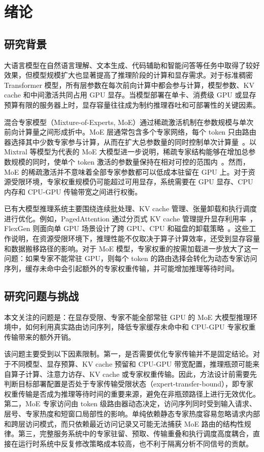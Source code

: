 \cleardoublepage

\section{绪论}

\subsection{研究背景}

大语言模型在自然语言理解、文本生成、代码辅助和智能问答等任务中取得了较好效果，但模型规模扩大也显著提高了推理阶段的计算和显存需求。对于标准稠密 Transformer 模型，所有层参数在每次前向计算中都会参与计算，模型参数、KV cache 和中间激活共同占用 GPU 显存。当模型部署在单卡、消费级 GPU 或显存预算有限的服务器上时，显存容量往往成为制约推理吞吐和可部署性的关键因素。

混合专家模型（Mixture-of-Experts, MoE）通过稀疏激活机制在参数规模与单次前向计算量之间形成折中。MoE 层通常包含多个专家网络，每个 token 只由路由器选择其中少数专家参与计算，从而在扩大总参数量的同时控制单次计算量~\cite{shazeer2017outrageously,fedus2022switch}。以 Mixtral 等模型为代表的 MoE 大模型进一步说明，稀疏专家结构能够在增加总参数规模的同时，使单个 token 激活的参数量保持在相对可控的范围内~\cite{jiang2024mixtral}。然而，MoE 的稀疏激活并不意味着全部专家参数都可以低成本驻留在 GPU 上。对于资源受限环境，专家权重规模仍可能超过可用显存，系统需要在 GPU 显存、CPU 内存和 CPU-GPU 传输带宽之间进行权衡。

已有大模型推理系统主要围绕连续批处理、KV cache 管理、张量卸载和执行调度进行优化。例如，PagedAttention 通过分页式 KV cache 管理提升显存利用率~\cite{kwon2023pagedattention}，FlexGen 则面向单 GPU 场景设计了跨 GPU、CPU 和磁盘的卸载策略~\cite{sheng2023flexgen}。这些工作说明，在资源受限环境下，推理性能不仅取决于算子计算效率，还受到显存容量和数据搬移路径的影响。对于 MoE 模型，专家权重的按需加载进一步放大了这一问题：如果专家不能常驻 GPU，则每个 token 的路由选择会转化为动态专家访问序列，缓存未命中会引起额外的专家权重传输，并可能增加推理等待时间。

\subsection{研究问题与挑战}

本文关注的问题是：在显存受限、专家不能全部常驻 GPU 的 MoE 大模型推理环境中，如何利用真实路由访问序列，降低专家缓存未命中和 CPU-GPU 专家权重传输带来的额外开销。

该问题主要受到以下因素限制。第一，是否需要优化专家传输并不是固定结论。对于不同模型、显存预算、KV cache 预留和 CPU-GPU 带宽配置，推理瓶颈可能来自算子计算、注意力访存、KV cache 或专家权重传输。因此，方法设计前需要先判断目标部署配置是否处于专家传输受限状态（expert-transfer-bound），即专家权重传输是否成为推理等待时间的重要来源，避免在非瓶颈路径上进行无效优化。第二，MoE 专家访问由 token 级路由器动态决定，访问序列同时受到输入请求、层号、专家热度和短窗口局部性的影响。单纯依赖静态专家热度容易忽略请求内部和跨层访问模式，而只依赖最近访问记录又可能无法捕获 MoE 路由的结构性规律。第三，完整服务系统中的专家驻留、预取、传输重叠和执行调度高度耦合，直接在运行时系统中反复修改策略成本较高，也不利于隔离分析不同信号的贡献。

